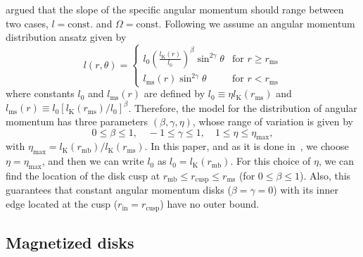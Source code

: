 \documentclass{aa}
\begin{document}
\cite{Jaroszynski:1980} argued that the slope of the specific angular momentum should range between two cases, $l = \mathrm{const.}$ and $\Omega = \mathrm{const}$. Following \citet{Qian:2009} we assume an angular momentum distribution ansatz given by  
\begin{equation}
l (r,\theta) = \left\{ \label{eq:ansatz} 
  \begin{array}{lr}
    l_0 \left(\frac{l_{\mathrm{K}}(r)}{l_0}\right)^{\beta}\sin^{2\gamma}{\theta} &  \text{for } r \geq r_{\mathrm{ms}}\\
    l_{\mathrm{ms}}(r)\sin^{2\gamma}{\theta} & \text{for } r < r_{\mathrm{ms}}
  \end{array}
\right.
\end{equation}
where constants $l_0$ and $l_{\mathrm{ms}}(r)$ are defined by $l_0 \equiv \eta l_{\mathrm{K}}(r_{\mathrm{ms}})$ and $l_{\mathrm{ms}}(r) \equiv l_0 [l_{\mathrm{K}}(r_{\mathrm{ms}})/l_0]^{\beta}$. Therefore, the model for the distribution of angular momentum has three parameters $(\beta, \gamma, \eta)$, whose range of variation is given by~\citep{Qian:2009}
\begin{equation}
0 \leq \beta \leq 1, \quad -1 \leq \gamma \leq 1, \quad 1 \leq \eta \leq \eta_{\mathrm{max}},
\end{equation}
with $\eta_{\mathrm{max}} = l_{\mathrm{K}}(r_{\mathrm{mb}})/l_{\mathrm{K}}(r_{\mathrm{ms}})$. In this paper, and as it is done in~\citet{Qian:2009}, we choose $\eta = \eta_{\mathrm{max}}$, and then we can write $l_0$ as $l_0 = l_{\mathrm{K}}(r_{\mathrm{mb}})$. For this choice of $\eta$, we can find the location of the disk cusp at $r_{\mathrm{mb}} \leq r_{\mathrm{cusp}} \leq r_{\mathrm{ms}}$ (for $0 \leq \beta \leq 1$). Also, this guarantees that constant angular momentum disks ($\beta = \gamma = 0$) with its inner edge located at the cusp ($r_{\mathrm{in}} = r_{\mathrm{cusp}}$) have no outer bound.

\subsection{Magnetized disks}
\end{document}
